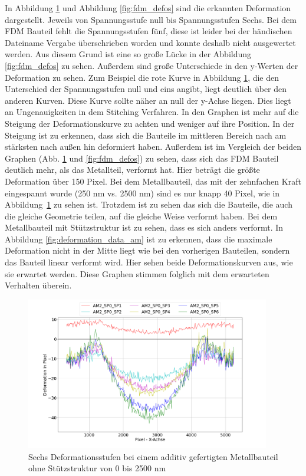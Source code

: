 In Abbildung \ref{fig:am_defos} und Abbildung \ref{fig:fdm_defos} sind die erkannten
Deformation dargestellt. Jeweils von Spannungsstufe null bis 
Spannungsstufen Sechs. Bei dem FDM Bauteil fehlt die Spannungsstufen fünf, 
diese ist leider bei der händischen Dateiname Vergabe überschrieben worden und konnte 
deshalb nicht ausgewertet werden. Aus diesem Grund ist eine so große Lücke in der 
Abbildung \ref{fig:fdm_defos} zu sehen.
Außerdem sind große Unterschiede in den y-Werten der Deformation zu sehen. Zum Beispiel 
die rote Kurve in Abbildung \ref{fig:am_defos}, die den Unterschied der Spannungsstufen 
null und eins angibt, liegt deutlich über den anderen Kurven. 
Diese Kurve sollte näher an null der y-Achse liegen. 
Dies liegt an Ungenauigkeiten in dem Stitching Verfahren. In den Graphen ist mehr 
auf die Steigung der Deformationskurve zu achten und weniger auf ihre Position.
In der Steigung ist zu erkennen, dass
sich die Bauteile im mittleren Bereich nach am stärksten nach außen hin deformiert haben.
Außerdem ist im Vergleich der beiden Graphen (Abb. \ref{fig:am_defos} und \ref{fig:fdm_defos}) 
zu sehen, dass sich das FDM Bauteil deutlich mehr, als das Metallteil, verformt hat. 
Hier beträgt die größte Deformation über 150 Pixel.
Bei dem Metallbauteil, das mit der zehnfachen Kraft eingespannt wurde (250 nm vs. 2500 nm)
sind es nur knapp 40 Pixel, wie in Abbildung~\ref{fig:am_defos} zu sehen ist.
Trotzdem ist zu sehen das sich die Bauteile, die auch die 
gleiche Geometrie teilen, auf die gleiche Weise verformt haben.
Bei dem Metallbauteil mit Stützstruktur ist zu sehen, dass es sich anders 
verformt. In Abbildung \ref{fig:deformation_data_am} ist zu erkennen, dass 
die maximale Deformation nicht in der Mitte liegt wie bei den vorherigen Bauteilen, 
sondern das Bauteil linear verformt wird. Hier sehen beide Deformationskurven aus, 
wie sie erwartet werden. Diese Graphen stimmen folglich mit dem erwarteten Verhalten überein.

\begin{figure}[H]
  \centering
  \includegraphics[width=0.95\textwidth]{images/am2_all_defos.png}
  \caption{Sechs Deformationsstufen bei einem additiv gefertigten Metallbauteil ohne
  Stützstruktur von 0 bis 2500 nm}
  \label{fig:am_defos}
\end{figure}

